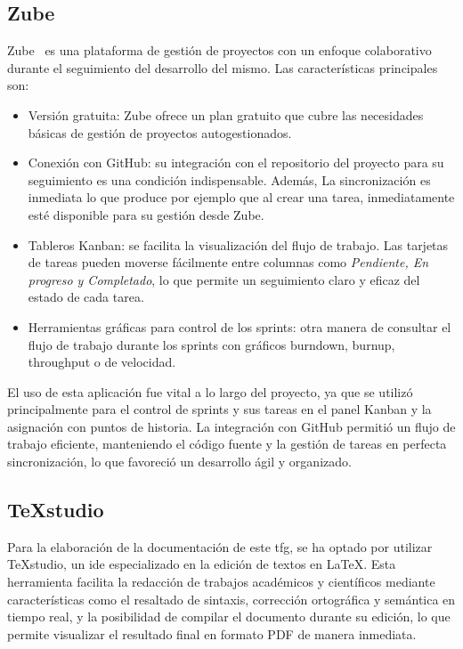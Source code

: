 	\subsection{Zube}
	Zube~\cite{zube} es una plataforma de gestión de proyectos con un enfoque colaborativo durante el seguimiento del desarrollo del mismo. Las características principales son:
	\begin{itemize}
		
		\item Versión gratuita: Zube ofrece un plan gratuito que cubre las necesidades básicas de gestión de proyectos autogestionados.
		
		\item Conexión con GitHub: su integración con el repositorio del proyecto para su seguimiento es una condición indispensable. Además, La sincronización es inmediata lo que produce por ejemplo que al crear una tarea, inmediatamente esté disponible para su gestión desde Zube.
		
		\item Tableros Kanban: se facilita la visualización del flujo de trabajo. Las tarjetas de tareas pueden moverse fácilmente entre columnas como \textit{Pendiente, En progreso y Completado}, lo que permite un seguimiento claro y eficaz del estado de cada tarea.
		
		\item Herramientas gráficas para control de los sprints: otra manera de consultar el flujo de trabajo durante los sprints con gráficos burndown, burnup, throughput o de velocidad.
	 
	\end{itemize}
	
	El uso de esta aplicación fue vital a lo largo del proyecto, ya que se utilizó principalmente para el control de sprints y sus tareas en el panel Kanban y la asignación con puntos de historia. La integración con GitHub permitió un flujo de trabajo eficiente, manteniendo el código fuente y la gestión de tareas en perfecta sincronización, lo que favoreció un desarrollo ágil y organizado. 
	
	\subsection{TeXstudio}
	Para la elaboración de la documentación de este \acrshort{tfg}, se ha optado por utilizar TeXstudio, un \acrfull{ide} especializado en la edición de textos en LaTeX. Esta herramienta facilita la redacción de trabajos académicos y científicos mediante características como el resaltado de sintaxis, corrección ortográfica y semántica en tiempo real, y la posibilidad de compilar el documento durante su edición, lo que permite visualizar el resultado final en formato PDF de manera inmediata.
	
